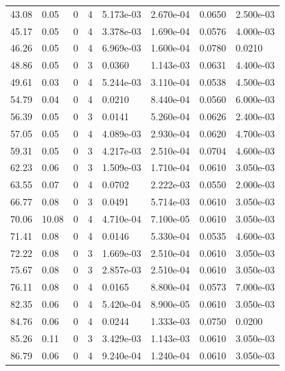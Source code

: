 \documentclass[preview]{standalone}
\begin{document}
{{\begin{tabular}{L{1.2cm}C{1.2cm} C{0.3cm}C{0.5cm} C{1.4cm}C{1.4cm} C{1.4cm}C{1.4cm}}
  43.08  &  0.05  & 0     &  4 &  5.173e-03  & 2.670e-04  & 0.0650 &  2.500e-03   \\ 
  45.17  &  0.05  & 0     &  4 &  3.378e-03  & 1.690e-04  & 0.0576 &  4.000e-03   \\ 
  46.26  &  0.05  & 0     &  4 &  6.969e-03  & 1.600e-04  & 0.0780 &  0.0210   \\ 
  48.86  &  0.05  & 0     &  3 &  0.0360  & 1.143e-03  & 0.0631 &  4.400e-03   \\ 
  49.61  &  0.03  & 0     &  4 &  5.244e-03  & 3.110e-04  & 0.0538 &  4.500e-03   \\ 
  54.79  &  0.04  & 0     &  4 &  0.0210  & 8.440e-04  & 0.0560 &  6.000e-03   \\ 
  56.39  &  0.05  & 0     &  3 &  0.0141  & 5.260e-04  & 0.0626 &  2.400e-03   \\ 
  57.05  &  0.05  & 0     &  4 &  4.089e-03  & 2.930e-04  & 0.0620 &  4.700e-03   \\ 
  59.31  &  0.05  & 0     &  3 &  4.217e-03  & 2.510e-04  & 0.0704 &  4.600e-03   \\ 
  62.23  &  0.06  & 0     &  3 &  1.509e-03  & 1.710e-04  & 0.0610 &  3.050e-03   \\ 
  63.55  &  0.07  & 0     &  4 &  0.0702  & 2.222e-03  & 0.0550 &  2.000e-03   \\ 
  66.77  &  0.08  & 0     &  3 &  0.0491  & 5.714e-03  & 0.0610 &  3.050e-03   \\ 
  70.06  &  10.08  & 0     &  4 &  4.710e-04  & 7.100e-05  & 0.0610 &  3.050e-03   \\ 
  71.41  &  0.08  & 0     &  4 &  0.0146  & 5.330e-04  & 0.0535 &  4.600e-03   \\ 
  72.22  &  0.08  & 0     &  3 &  1.669e-03  & 2.510e-04  & 0.0610 &  3.050e-03   \\ 
  75.67  &  0.08  & 0     &  3 &  2.857e-03  & 2.510e-04  & 0.0610 &  3.050e-03   \\ 
  76.11  &  0.08  & 0     &  4 &  0.0165  & 8.800e-04  & 0.0573 &  7.000e-03   \\ 
  82.35  &  0.06  & 0     &  4 &  5.420e-04  & 8.900e-05  & 0.0610 &  3.050e-03   \\ 
  84.76  &  0.06  & 0     &  4 &  0.0244  & 1.333e-03  & 0.0750 &  0.0200   \\ 
  85.26  &  0.11  & 0     &  3 &  3.429e-03  & 1.143e-03  & 0.0610 &  3.050e-03   \\ 
  86.79  &  0.06  & 0     &  4 &  9.240e-04  & 1.240e-04  & 0.0610 &  3.050e-03   \\ 

\end{tabular}}}
\end{document}
